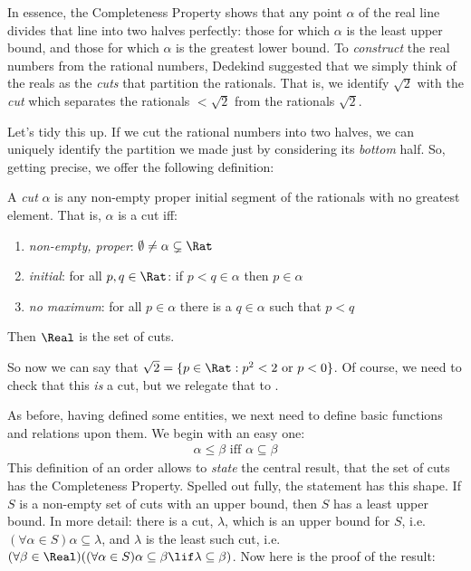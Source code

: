 \documentclass[../../../include/open-logic-section]{subfiles}
\begin{document}

In essence, the Completeness Property shows that any point $\alpha$ of
the real line divides that line into two halves perfectly: those for
which $\alpha$ is the least upper bound, and those for which $\alpha$
is the greatest lower bound. To \emph{construct} the real numbers from
the rational numbers, Dedekind suggested that we simply think of the
reals as the \emph{cuts} that partition the rationals. That is, we
identify $\sqrt{2}$ with the \emph{cut} which separates the rationals
$< \sqrt{2}$ from the rationals $ \sqrt{2}$. 

Let's tidy this up. If we cut the rational numbers into two halves, we
can uniquely identify the partition we made just by considering its
\emph{bottom} half. So, getting precise, we offer the following
definition:

\begin{defn}[Cut] 
A \emph{cut} $\alpha$ is any non-empty proper
initial segment of the rationals with no greatest element. That is,
$\alpha$ is a cut iff:
\begin{enumerate}
	\item \emph{non-empty, proper}: $\emptyset \neq \alpha \subsetneq \Rat$
	\item \emph{initial}: for all $p,q \in \Rat$: if $p < q \in \alpha$ then $p \in \alpha$
	\item \emph{no maximum}: for all $p \in \alpha$ there is a $q \in \alpha$ such that $p < q$ 
\end{enumerate} 
Then $\Real$ is the set of cuts. 
\end{defn}

So now we can say that $\sqrt{2} = \Setabs{p \in \Rat}{p^2 < 2\text{
or }p < 0}$. Of course, we need to check that this \emph{is} a cut,
but we relegate that to .

As before, having defined some entities, we next need to define basic
functions and relations upon them. We begin with an easy one:
\begin{align*}
	\alpha \leq \beta \text{ iff }\alpha \subseteq \beta
\end{align*}
This definition of an order allows to \emph{state} the central result,
that the set of cuts has the Completeness Property. Spelled out fully,
the statement has this shape. If $S$ is a non-empty set of cuts with
an upper bound, then $S$ has a least upper bound. In more detail: there is a cut, $\lambda$, which is an upper bound for $S$, i.e.\ $(\forall \alpha \in S)\alpha \subseteq
\lambda$, and $\lambda$ is the least such cut, i.e.\ $(\forall \beta \in \Real)((\forall \alpha \in S)\alpha \subseteq \beta \lif \lambda \subseteq \beta)$. Now here is
the proof of the result:
\end{document}
